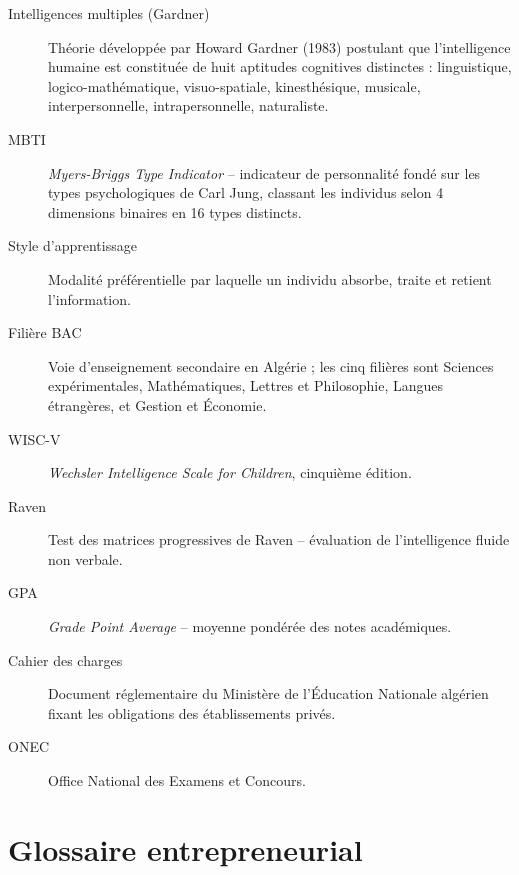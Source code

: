 \documentclass[12pt,a4paper,oneside]{report}
\begin{document}
\begin{description}
  \item[Intelligences multiples (Gardner)] Théorie développée par Howard Gardner (1983) postulant que l'intelligence humaine est constituée de huit aptitudes cognitives distinctes : linguistique, logico-mathématique, visuo-spatiale, kinesthésique, musicale, interpersonnelle, intrapersonnelle, naturaliste.
  \item[MBTI] \textit{Myers-Briggs Type Indicator} -- indicateur de personnalité fondé sur les types psychologiques de Carl Jung, classant les individus selon 4 dimensions binaires en 16 types distincts.
  \item[Style d'apprentissage] Modalité préférentielle par laquelle un individu absorbe, traite et retient l'information.
  \item[Filière BAC] Voie d'enseignement secondaire en Algérie ; les cinq filières sont Sciences expérimentales, Mathématiques, Lettres et Philosophie, Langues étrangères, et Gestion et Économie.
  \item[WISC-V] \textit{Wechsler Intelligence Scale for Children}, cinquième édition.
  \item[Raven] Test des matrices progressives de Raven -- évaluation de l'intelligence fluide non verbale.
  \item[GPA] \textit{Grade Point Average} -- moyenne pondérée des notes académiques.
  \item[Cahier des charges] Document réglementaire du Ministère de l'Éducation Nationale algérien fixant les obligations des établissements privés.
  \item[ONEC] Office National des Examens et Concours.
\end{description}

\chapter{Glossaire entrepreneurial}
\end{document}

